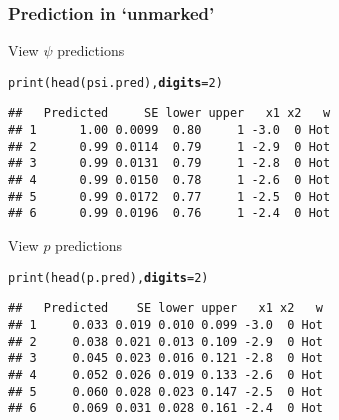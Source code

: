 \documentclass[color=usenames,dvipsnames]{beamer}\usepackage[]{graphicx}\usepackage[]{color}
\makeatletter
\newcommand{\hlnum}[1]{\textcolor[rgb]{0.69,0.494,0}{#1}}%
\newcommand{\hlstd}[1]{\textcolor[rgb]{0,0,0}{#1}}%
\newcommand{\hlkwc}[1]{\textcolor[rgb]{0,0,0}{\textbf{#1}}}%
\newcommand{\hlkwd}[1]{\textcolor[rgb]{0.004,0.004,0.506}{#1}}%
\newenvironment{kframe}{%
 \def\at@end@of@kframe{}%
 \ifinner\ifhmode%
  \def\at@end@of@kframe{\end{minipage}}%
  \begin{minipage}{\columnwidth}%
 \fi\fi%
 \def\FrameCommand##1{\hskip\@totalleftmargin \hskip-\fboxsep
 \colorbox{shadecolor}{##1}\hskip-\fboxsep
     \hskip-\linewidth \hskip-\@totalleftmargin \hskip\columnwidth}%
 \MakeFramed {\advance\hsize-\width
   \@totalleftmargin\z@ \linewidth\hsize
   \@setminipage}}%
 {\par\unskip\endMakeFramed%
 \at@end@of@kframe}
\newenvironment{knitrout}{}{} %
\makeatother
\begin{document}
\begin{frame}[fragile]
  \frametitle{Prediction in `unmarked'}
  \small
  View $\psi$ predictions
\begin{knitrout}\footnotesize
{}\color{fgcolor}\begin{kframe}
\begin{alltt}
\hlkwd{print}\hlstd{(}\hlkwd{head}\hlstd{(psi.pred),} \hlkwc{digits}\hlstd{=}\hlnum{2}\hlstd{)}
\end{alltt}
\begin{verbatim}
##   Predicted     SE lower upper   x1 x2   w
## 1      1.00 0.0099  0.80     1 -3.0  0 Hot
## 2      0.99 0.0114  0.79     1 -2.9  0 Hot
## 3      0.99 0.0131  0.79     1 -2.8  0 Hot
## 4      0.99 0.0150  0.78     1 -2.6  0 Hot
## 5      0.99 0.0172  0.77     1 -2.5  0 Hot
## 6      0.99 0.0196  0.76     1 -2.4  0 Hot
\end{verbatim}
\end{kframe}
\end{knitrout}
\pause
\vfill
  View $p$ predictions
\begin{knitrout}\footnotesize
{}\color{fgcolor}\begin{kframe}
\begin{alltt}
\hlkwd{print}\hlstd{(}\hlkwd{head}\hlstd{(p.pred),} \hlkwc{digits}\hlstd{=}\hlnum{2}\hlstd{)}
\end{alltt}
\begin{verbatim}
##   Predicted    SE lower upper   x1 x2   w
## 1     0.033 0.019 0.010 0.099 -3.0  0 Hot
## 2     0.038 0.021 0.013 0.109 -2.9  0 Hot
## 3     0.045 0.023 0.016 0.121 -2.8  0 Hot
## 4     0.052 0.026 0.019 0.133 -2.6  0 Hot
## 5     0.060 0.028 0.023 0.147 -2.5  0 Hot
## 6     0.069 0.031 0.028 0.161 -2.4  0 Hot
\end{verbatim}
\end{kframe}
\end{knitrout}
\end{frame}
\end{document}
